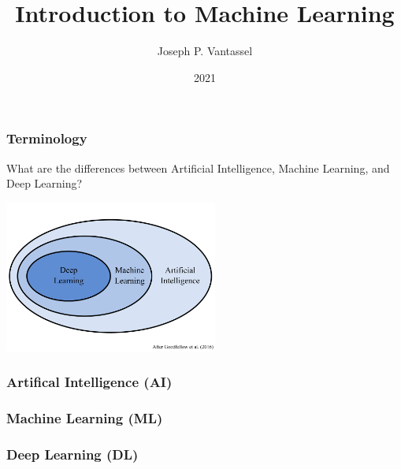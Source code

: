 \documentclass{beamer}
\title{Introduction to Machine Learning}
\author{Joseph P. Vantassel}
\institute{The University of Texas at Austin}
\date{2021}
\begin{document}
\frame{\titlepage}

\begin{frame}

\frametitle{Terminology}

What are the differences between Artificial Intelligence, Machine Learning, and Deep Learning?

\begin{center}
\includegraphics[height=5cm]{figs/0-ai_ml_dl_diagram.png}
\end{center}

\end{frame}
    
\begin{frame}

\frametitle{Artifical Intelligence (AI)}

\end{frame}

\begin{frame}

\frametitle{Machine Learning (ML)}

\end{frame}

\begin{frame}

\frametitle{Deep Learning (DL)}

\end{frame}
\end{document}
